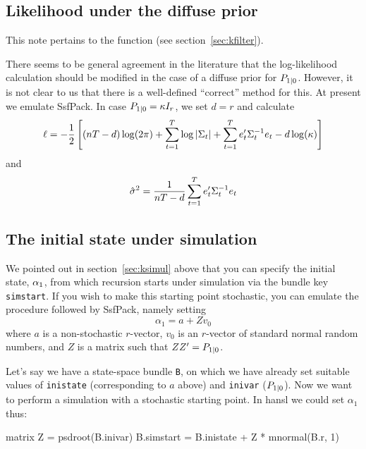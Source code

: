 \documentclass[a4paper]{article}
\begin{document}
\subsection{Likelihood under the diffuse prior}
\label{sec:lldiffuse}

This note pertains to the  function (see
section~\ref{sec:kfilter}). 

There seems to be general agreement in the literature that the
log-likelihood calculation should be modified in the case of a diffuse
prior for $P_{1|0}$.  However, it is not clear to us that
there is a well-defined ``correct'' method for this.  At present we
emulate \textsf{SsfPack}.  In case
$P_{1|0} = \kappa I_r$, we set $d = r$ and calculate
%
\[
  \ell = -\frac{1}{2} \left[(nT-d) \log(2 \pi) + 
    \sum_{t=1}^T\log \left|\Sigma_t\right| + 
    \sum_{t=1}^Te_t'\Sigma_t^{-1} e_t
    - d \log(\kappa)
  \right]
\]
%
and
%
\[
\hat{\sigma}^2 = \frac{1}{nT-d} 
   \sum_{t=1}^Te_t'\Sigma_t^{-1} e_t
\]

\subsection{The initial state under simulation}
\label{sec:simstart}

We pointed out in section~\ref{sec:ksimul} above that you can specify
the initial state, $\alpha_1$, from which recursion starts under
simulation via the bundle key \texttt{simstart}. If you wish to make
this starting point stochastic, you can emulate the procedure followed
by \textsf{SsfPack}, namely setting
\[
\alpha_1 = a + Z v_0
\]
where $a$ is a non-stochastic $r$-vector, $v_0$ is an $r$-vector
of standard normal random numbers, and $Z$ is a matrix such
that $ZZ' = P_{1|0}$.

Let's say we have a state-space bundle \texttt{B}, on which we have
already set suitable values of \texttt{inistate} (corresponding to $a$
above) and \texttt{inivar} ($P_{1|0}$).  Now we want to
perform a simulation with a stochastic starting point. In hansl we
could set $\alpha_1$ thus:
%
\begin{code}
matrix Z = psdroot(B.inivar)
B.simstart = B.inistate + Z * mnormal(B.r, 1)
\end{code}




 
\end{document}
